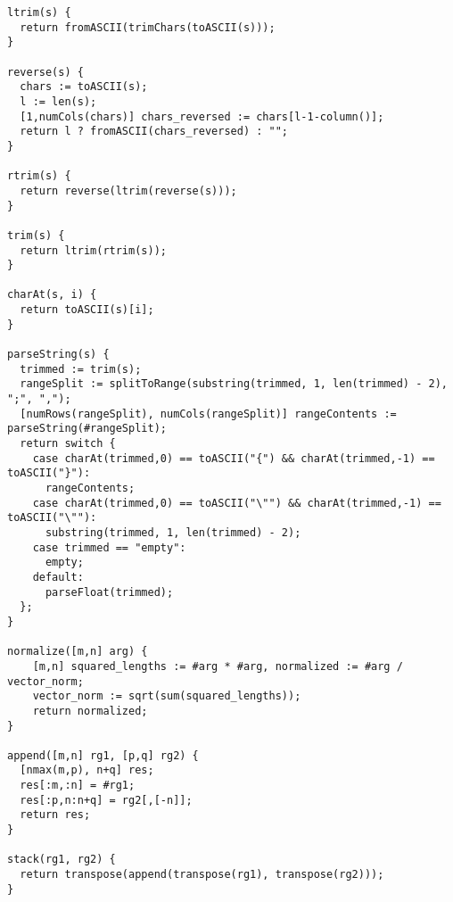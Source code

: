 \begin{lstlisting}
ltrim(s) {
  return fromASCII(trimChars(toASCII(s)));
}

reverse(s) {
  chars := toASCII(s);
  l := len(s);
  [1,numCols(chars)] chars_reversed := chars[l-1-column()];
  return l ? fromASCII(chars_reversed) : "";
}

rtrim(s) {
  return reverse(ltrim(reverse(s)));
}

trim(s) {
  return ltrim(rtrim(s));
}

charAt(s, i) {
  return toASCII(s)[i];
}

parseString(s) {
  trimmed := trim(s);
  rangeSplit := splitToRange(substring(trimmed, 1, len(trimmed) - 2), ";", ",");
  [numRows(rangeSplit), numCols(rangeSplit)] rangeContents := parseString(#rangeSplit);
  return switch {
    case charAt(trimmed,0) == toASCII("{") && charAt(trimmed,-1) == toASCII("}"):
      rangeContents;
    case charAt(trimmed,0) == toASCII("\"") && charAt(trimmed,-1) == toASCII("\""):
      substring(trimmed, 1, len(trimmed) - 2);
    case trimmed == "empty":
      empty;
    default:
      parseFloat(trimmed);
  };
}

normalize([m,n] arg) {
	[m,n] squared_lengths := #arg * #arg, normalized := #arg / vector_norm;
	vector_norm := sqrt(sum(squared_lengths));
	return normalized;
}

append([m,n] rg1, [p,q] rg2) {
  [nmax(m,p), n+q] res;
  res[:m,:n] = #rg1;
  res[:p,n:n+q] = rg2[,[-n]];
  return res;
}

stack(rg1, rg2) {
  return transpose(append(transpose(rg1), transpose(rg2)));
}
\end{lstlisting}
